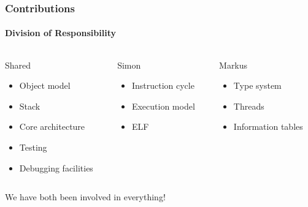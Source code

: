\documentclass[handout]{beamer}
\begin{document}
\begin{frame}
  \frametitle{Contributions}
  \framesubtitle{Division of Responsibility}

  \begin{columns}[onlytextwidth, t]
    \begin{column}{0.33\textwidth}
      Shared
      \fontsize{9pt}{15}\selectfont
      \begin{itemize}
      \item Object model
      \item Stack
      \item Core architecture
      \item Testing
      \item Debugging facilities
      \end{itemize}
    \end{column}

    \pause{}

    \begin{column}{0.33\textwidth}
      Simon
      \fontsize{9pt}{15}\selectfont
      \begin{itemize}
      \item Instruction cycle
      \item Execution model
      \item ELF
      \end{itemize}
    \end{column}

    \pause{}

    \begin{column}{0.33\textwidth}
      Markus
      \fontsize{9pt}{15}\selectfont
      \begin{itemize}
      \item Type system
      \item Threads
      \item Information tables
      \end{itemize}
    \end{column}
  \end{columns}

  \pause{}

  \vspace{30pt}
  \centering
  We have both been involved in everything!

\end{frame}
\end{document}
